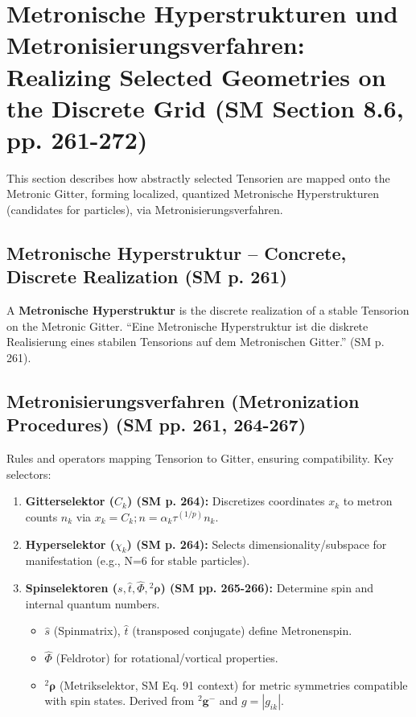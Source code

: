 \documentclass[
    12pt,              %
    a4paper,           %
    headings=normal,   %
    twoside=true,      %
    BCOR=8mm,          %
]{scrbook}
\newcommand{\q}[1]{\enquote{#1}}
\newcommand{\kompositionsfeld}{{}^2\mathbf{g}}
\begin{document}
\section{Metronische Hyperstrukturen und Metronisierungsverfahren: Realizing Selected Geometries on the Discrete Grid (SM Section 8.6, pp. 261-272)}
\label{sec:ch11_2_hyperstrukturen_metronisierung}

This section describes how abstractly selected Tensorien are mapped onto the Metronic Gitter, forming localized, quantized Metronische Hyperstrukturen (candidates for particles), via Metronisierungsverfahren.

\subsection{Metronische Hyperstruktur – Concrete, Discrete Realization (SM p. 261)}
\label{sec:ch11_2_1_hyperstruktur_def}
A \textbf{Metronische Hyperstruktur} is the discrete realization of a stable Tensorion on the Metronic Gitter. \q{Eine Metronische Hyperstruktur ist die diskrete Realisierung eines stabilen Tensorions auf dem Metronischen Gitter.} (SM p. 261).

\subsection{Metronisierungsverfahren (Metronization Procedures) (SM pp. 261, 264-267)}
\label{sec:ch11_2_2_metronisierungsverfahren}
Rules and operators mapping Tensorion to Gitter, ensuring compatibility. Key selectors:
\begin{enumerate}
    \item  \textbf{Gitterselektor (\(C_k\)) (SM p. 264):} Discretizes coordinates \(x_k\) to metron counts \(n_k\) via \(x_k = C_k ; n = \alpha_k \tau^{(1/p)} n_k\).
    \item  \textbf{Hyperselektor (\(\chi_k\)) (SM p. 264):} Selects dimensionality/subspace for manifestation (e.g., N=6 for stable particles).
    \item  \textbf{Spinselektoren (\(s, \hat{t}, \hat{\Phi}, {}^2\bm{\rho}\)) (SM pp. 265-266):} Determine spin and internal quantum numbers.
        \begin{itemize}
            \item   \(\hat{s}\) (Spinmatrix), \(\hat{t}\) (transposed conjugate) define Metronenspin.
            \item   \(\hat{\Phi}\) (Feldrotor) for rotational/vortical properties.
            \item   \({}^2\bm{\rho}\) (Metrikselektor, SM Eq. 91 context) for metric symmetries compatible with spin states. Derived from \(\kompositionsfeld^-\) and \(g = |g_{ik}|\).
        \end{itemize}
\end{enumerate}
\end{document}
